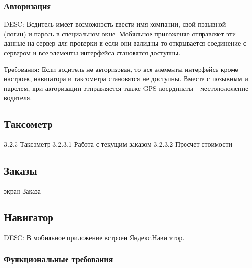   	  \subsubsection{Авторизация}

  		DESC: Водитель имеет возможность ввести имя компании, свой позывной (логин) и пароль в специальном окне. Мобильное приложение отправляет эти данные на сервер для проверки и если они валидны то открывается соединение с сервером и все элементы интерфейса становятся доступны.

  		Требования: 
  		Если водитель не авторизован, то все элементы интерфейса кроме настроек, навигатора и таксометра становятся не доступны.
  		Вместе с позывным и паролем, при авторизации отправляется также GPS координаты - местоположение водителя.

  \subsection{Таксометр}


    3.2.3 Таксометр
    3.2.3.1 Работа с текущим заказом
    3.2.3.2 Просчет стоимости

  \subsection{Заказы}

    экран Заказа

  \subsection{Навигатор}

    DESC: В мобильное приложение встроен Яндекс.Навигатор.

    \subsubsection{Функциональные требования}

